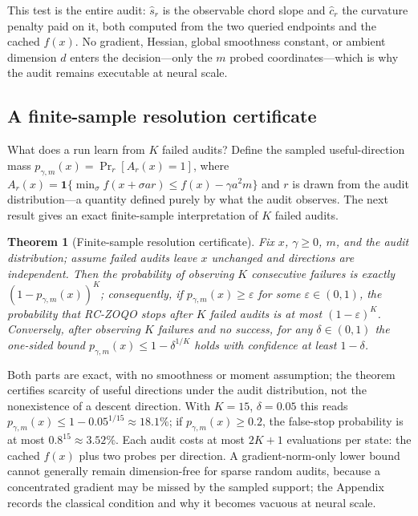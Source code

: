 \documentclass{article}
\newtheorem{theorem}{Theorem}
\begin{document}
This test is the entire audit: $\widehat s_r$ is the observable chord slope and $\widehat c_r$ the curvature penalty paid on it, both computed from the two queried endpoints and the cached $f(x)$. No gradient, Hessian, global smoothness constant, or ambient dimension $d$ enters the decision---only the $m$ probed coordinates---which is why the audit remains executable at neural scale.

\subsection{A finite-sample resolution certificate}
What does a run learn from $K$ failed audits? Define the sampled useful-direction mass $p_{\gamma,m}(x)=\Pr_r[A_r(x)=1]$, where $A_r(x)=\mathbf 1\{\min_{\sigma}f(x+\sigma ar)\le f(x)-\gamma a^2m\}$ and $r$ is drawn from the audit distribution---a quantity defined purely by what the audit observes. The next result gives an exact finite-sample interpretation of $K$ failed audits.

\begin{theorem}[Finite-sample resolution certificate]
\label{thm:cert}
Fix $x$, $\gamma\ge0$, $m$, and the audit distribution; assume failed audits leave $x$ unchanged and directions are independent. Then the probability of observing $K$ consecutive failures is exactly $(1-p_{\gamma,m}(x))^K$; consequently, if $p_{\gamma,m}(x)\ge\varepsilon$ for some $\varepsilon\in(0,1)$, the probability that RC-ZOQO stops after $K$ failed audits is at most $(1-\varepsilon)^K$. Conversely, after observing $K$ failures and no success, for any $\delta\in(0,1)$ the one-sided bound $p_{\gamma,m}(x)\le1-\delta^{1/K}$ holds with confidence at least $1-\delta$.
\end{theorem}

Both parts are exact, with no smoothness or moment assumption; the theorem certifies scarcity of useful directions under the audit distribution, not the nonexistence of a descent direction. With $K{=}15$, $\delta{=}0.05$ this reads $p_{\gamma,m}(x)\le1-0.05^{1/15}\approx18.1\%$; if $p_{\gamma,m}(x)\ge0.2$, the false-stop probability is at most $0.8^{15}\approx3.52\%$. Each audit costs at most $2K+1$ evaluations per state: the cached $f(x)$ plus two probes per direction. A gradient-norm-only lower bound cannot generally remain dimension-free for sparse random audits, because a concentrated gradient may be missed by the sampled support; the Appendix records the classical condition and why it becomes vacuous at neural scale.
\end{document}
